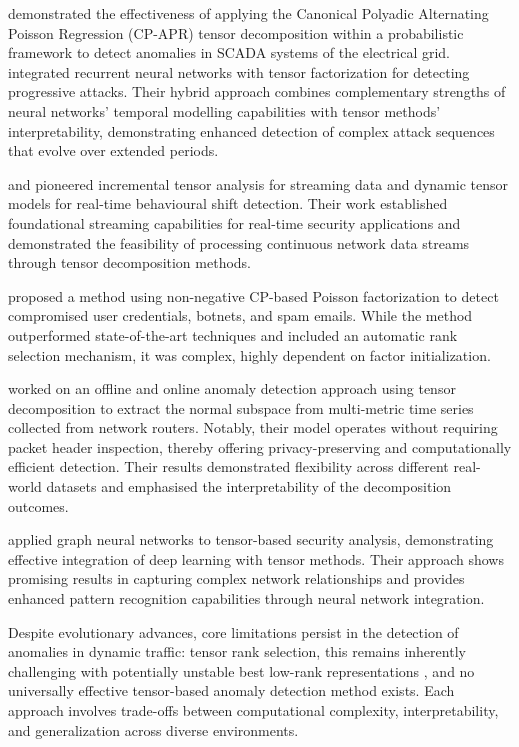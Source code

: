 \documentclass[preprint,12pt,authoryear]{elsarticle}
\begin{document}
\cite{most2023electrical} demonstrated the effectiveness of applying the Canonical Polyadic Alternating Poisson Regression (CP-APR) tensor decomposition within a probabilistic framework to detect anomalies in SCADA systems of the electrical grid.  \cite{zhang2019hybrid} integrated recurrent neural networks with tensor factorization for detecting progressive attacks. Their hybrid approach combines complementary strengths of neural networks' temporal modelling capabilities with tensor methods' interpretability, demonstrating enhanced detection of complex attack sequences that evolve over extended periods.


\cite{sun2006incremental} and \cite{sun2006beyond} pioneered incremental tensor analysis for streaming data and dynamic tensor models for real-time behavioural shift detection. Their work established foundational streaming capabilities for real-time security applications and demonstrated the feasibility of processing continuous network data streams through tensor decomposition methods.


\cite{eren2023general} proposed a method using non-negative CP-based Poisson factorization to detect compromised user credentials, botnets, and spam emails. While the method outperformed state-of-the-art techniques and included an automatic rank selection mechanism, it was complex, highly dependent on factor initialization. 


\cite{streit2021network} worked on an offline and online anomaly detection approach using tensor decomposition to extract the normal subspace from multi-metric time series collected from network routers. Notably, their model operates without requiring packet header inspection, thereby offering privacy-preserving and computationally efficient detection. Their results demonstrated flexibility across different real-world datasets and emphasised the interpretability of the decomposition outcomes. 

\cite{wu2021graph} applied graph neural networks to tensor-based security analysis, demonstrating effective integration of deep learning with tensor methods. Their approach shows promising results in capturing complex network relationships and provides enhanced pattern recognition capabilities through neural network integration. 


Despite evolutionary advances, core limitations persist in the detection of anomalies in dynamic traffic: tensor rank selection, this remains inherently challenging with potentially unstable best low-rank representations \cite{kruskal1977three, kolda2009tensor}, and no universally effective tensor-based anomaly detection method exists. Each approach involves trade-offs between computational complexity, interpretability, and generalization across diverse environments. 
\end{document}
